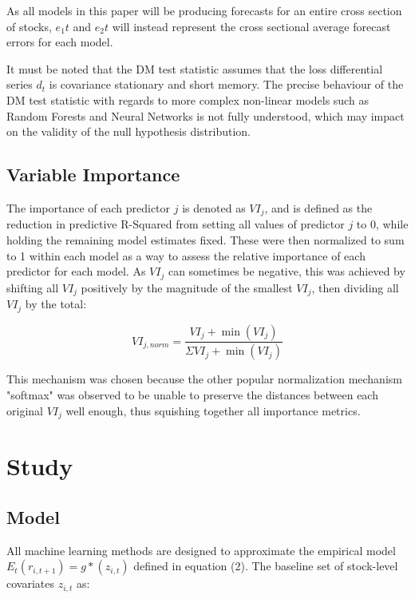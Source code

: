 \documentclass[a4paper, table]{article}
\begin{document}
As all models in this paper will be producing forecasts for an entire cross section of stocks, $e_1t$ and $e_2t$ will instead represent the cross sectional average forecast errors for each model.

It must be noted that the DM test statistic assumes that the loss differential series $d_t$ is covariance stationary and short memory. The precise behaviour of the DM test statistic with regards to more complex non-linear models such as Random Forests and Neural Networks is not fully understood, which may impact on the validity of the null hypothesis distribution. 

\subsection{Variable Importance}

The importance of each predictor $j$ is denoted as $VI_j$, and is defined as the reduction in predictive R-Squared from setting all values of predictor $j$ to 0, while holding the remaining model estimates fixed. These were then normalized to sum to 1 within each model as a way to assess the relative importance of each predictor for each model. As $VI_j$ can sometimes be negative, this was achieved by shifting all $VI_j$ positively by the magnitude of the smallest $VI_j$, then dividing all $VI_j$ by the total:

\begin{equation}
	VI_{j, norm} = \frac{VI_j + \operatorname{min}(VI_j)}
	{\Sigma VI_j + \operatorname{min}(VI_j)}
\end{equation}

This mechanism was chosen because the other popular normalization mechanism "softmax" was observed to be unable to preserve the distances between each original $VI_j$ well enough, thus squishing together all importance metrics.


\section{Study}

\subsection{Model}

All machine learning methods are designed to approximate the empirical model \( E_t(r_{i, t+1}) = g*(z_{i,t}) \) defined in equation (2). The baseline set of stock-level covariates \( z_{i,t} \) as:
\end{document}
